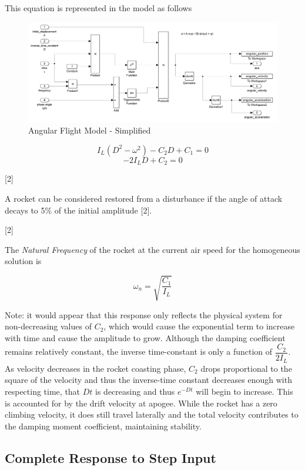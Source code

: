 \documentclass[]{article}
\begin{document}
This equation is represented in the model as follows

\begin{figure}[htbp]
\centering
\includegraphics{images/angular_model_simplified.png}
\caption{Angular Flight Model - Simplified
\label{angular_model_simplified}}
\end{figure}

\[
I_L (D^2 - \omega^2) - C_2 D + C_1 = 0
\] \[
-2 I_L D + C_2 = 0
\]

{[}2{]}

A rocket can be considered restored from a disturbance if the angle of
attack decays to 5\% of the initial amplitude {[}2{]}.

{[}2{]}

The \emph{Natural Frequency} of the rocket at the current air speed for
the homogeneous solution is

\begin{equation}
\label{eq_natural_frequency_homogeneous}
\omega_n = \sqrt{ \dfrac{C_1}{I_L} }
\end{equation}

Note: it would appear that this response only reflects the physical
system for non-decreasing values of \(C_2\), which would cause the
exponential term to increase with time and cause the amplitude to grow.
Although the damping coefficient remains relatively constant, the
inverse time-constant is only a function of \(\dfrac{C_2}{2 I_L}\). As
velocity decreases in the rocket coasting phase, \(C_2\) drops
proportional to the square of the velocity and thus the inverse-time
constant decreases enough with respecting time, that \(Dt\) is
decreasing and thus \(e^{-Dt}\) will begin to increase. This is
accounted for by the drift velocity at apogee. While the rocket has a
zero climbing velocity, it does still travel laterally and the total
velocity contributes to the damping moment coefficient, maintaining
stability.

\subsection{Complete Response to Step
Input}\label{complete-response-to-step-input}
\end{document}
